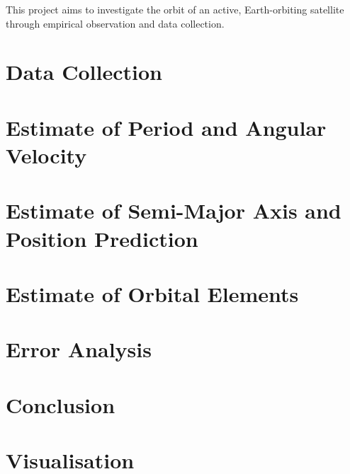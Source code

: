 \documentclass{article}
\begin{document}
This project aims to investigate the orbit of an active, Earth-orbiting satellite through empirical observation and data collection.

\section{Data Collection}

\section{Estimate of Period and Angular Velocity}

\section{Estimate of Semi-Major Axis and Position Prediction}

\section{Estimate of Orbital Elements}

\section{Error Analysis}

\section{Conclusion}

\section{Visualisation}

\printbibliography
\end{document}

